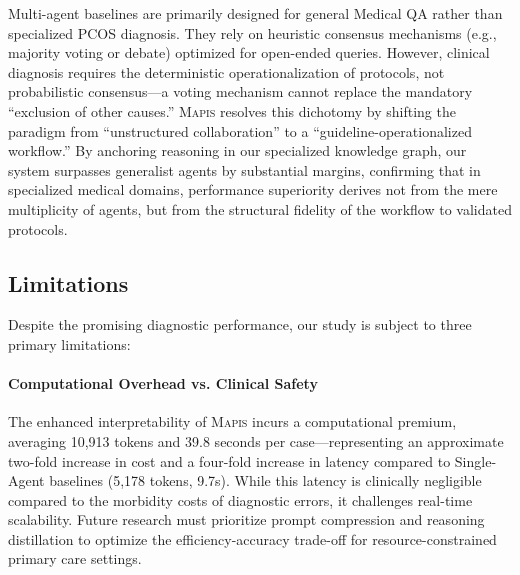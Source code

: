 \documentclass[a4paper,fleqn]{cas-dc}
\begin{document}
Multi-agent baselines are primarily designed for general Medical QA rather than specialized PCOS diagnosis. They rely on heuristic consensus mechanisms (e.g., majority voting or debate) optimized for open-ended queries. However, clinical diagnosis requires the deterministic operationalization of protocols, not probabilistic consensus—a voting mechanism cannot replace the mandatory ``exclusion of other causes.'' \textsc{Mapis} resolves this dichotomy by shifting the paradigm from ``unstructured collaboration'' to a ``guideline-operationalized workflow.'' By anchoring reasoning in our specialized knowledge graph, our system surpasses generalist agents by substantial margins, confirming that in specialized medical domains, performance superiority derives not from the mere multiplicity of agents, but from the structural fidelity of the workflow to validated protocols.




\subsection{Limitations} 
Despite the promising diagnostic performance, our study is subject to three primary limitations:

\paragraph{Computational Overhead vs. Clinical Safety} The enhanced interpretability of \textsc{Mapis} incurs a computational premium, averaging 10,913 tokens and 39.8 seconds per case—representing an approximate two-fold increase in cost and a four-fold increase in latency compared to Single-Agent baselines (5,178 tokens, 9.7s). While this latency is clinically negligible compared to the morbidity costs of diagnostic errors, it challenges real-time scalability. Future research must prioritize prompt compression and reasoning distillation to optimize the efficiency-accuracy trade-off for resource-constrained primary care settings.
\end{document}
